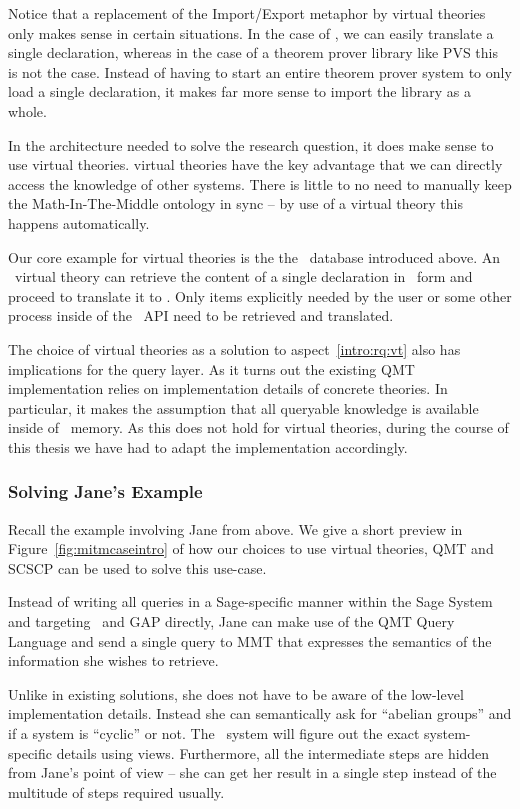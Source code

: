 Notice that a replacement of the Import/Export metaphor by virtual theories only makes sense in certain situations. 
In the case of \lmfdb, we can easily translate a single declaration, whereas in the case of a theorem prover library like PVS this is not the case. 
Instead of having to start an entire theorem prover system to only load a single declaration, it makes far more sense to import the library as a whole. 

In the architecture needed to solve the research question, it does make sense to use virtual theories. 
virtual theories have the key advantage that we can directly access the knowledge of other systems. 
There is little to no need to manually keep the Math-In-The-Middle ontology in sync -- by use of a virtual theory this happens automatically. 

Our core example for virtual theories is the the \lmfdb\ database introduced above. 
An \lmfdb\ virtual theory can retrieve the content of a single declaration in \lmfdb\ form and proceed to translate it to \omdocmmt. 
Only items explicitly needed by the user or some other process inside of the \mmt\ API need to be retrieved and translated. 

The choice of virtual theories as a solution to aspect~\ref{intro:rq:vt} also has implications for the query layer. 
As it turns out the existing QMT implementation relies on implementation details of concrete theories. 
In particular, it makes the assumption that all queryable knowledge is available inside of \mmt\ memory.
As this does not hold for virtual theories, during the course of this thesis we have had to adapt the implementation accordingly. 

\subsubsection*{Solving Jane's Example}\label{sec:intro:vtuse}


Recall the example involving Jane from above. 
We give a short preview in Figure~\ref{fig:mitmcaseintro} of how our choices to use virtual theories, QMT and SCSCP can be used to solve this use-case. 

Instead of writing all queries in a Sage-specific manner within the Sage System and targeting \lmfdb\ and GAP directly, Jane can make use of the QMT Query Language and send a single query to MMT that expresses the semantics of the information she wishes to retrieve. 

Unlike in existing solutions, she does not have to be aware of the low-level implementation details. 
Instead she can semantically ask for ``abelian groups'' and if a system is ``cyclic'' or not. 
The \mmt\ system will figure out the exact system-specific details using views. 
Furthermore, all the intermediate steps are hidden from Jane's point of view -- she can get her result in a single step instead of the multitude of steps required usually. 

